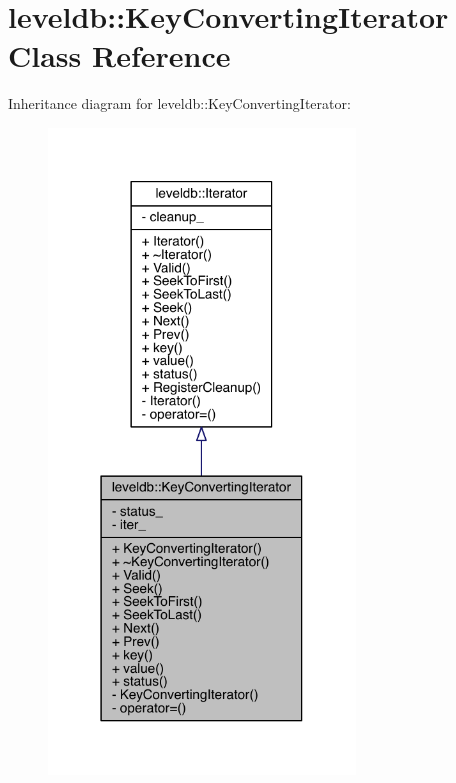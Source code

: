 \hypertarget{classleveldb_1_1_key_converting_iterator}{}\section{leveldb\+:\+:Key\+Converting\+Iterator Class Reference}
\label{classleveldb_1_1_key_converting_iterator}


Inheritance diagram for leveldb\+:\+:Key\+Converting\+Iterator\+:\nopagebreak
\begin{figure}[H]
\begin{center}
\leavevmode
\includegraphics[width=231pt]{classleveldb_1_1_key_converting_iterator__inherit__graph}
\end{center}
\end{figure}


